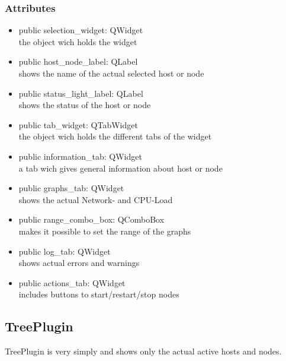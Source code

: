 \subsubsection{Attributes}
\begin{itemize}
  \item public selection\_widget: QWidget\\
  the object wich holds the widget
  \item public host\_node\_label: QLabel\\
  shows the name of the actual selected host or node
  \item public status\_light\_label: QLabel\\
  shows the status of the host or node
  \item public tab\_widget: QTabWidget\\
  the object wich holds the different tabs of the widget
  \item public information\_tab: QWidget\\
  a tab wich gives general information about host or node 
  \item public graphs\_tab: QWidget\\
  shows the actual Network- and CPU-Load
  \item public range\_combo\_box: QComboBox\\
  makes it possible to set the range of the graphs
  \item public log\_tab: QWidget\\
  shows actual errors and warnings
  \item public actions\_tab: QWidget\\
  includes buttons to start/restart/stop nodes
  
\end{itemize}

\subsection{TreePlugin}
TreePlugin is very simply and shows only the actual active hosts
and nodes.
